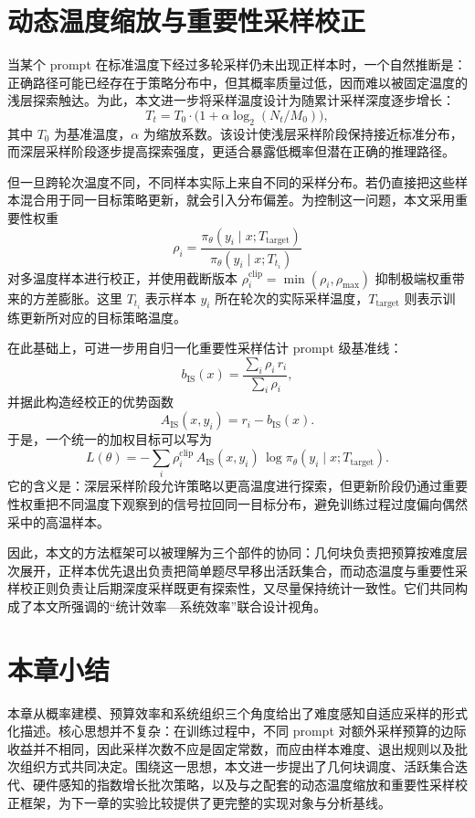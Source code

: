 \section{动态温度缩放与重要性采样校正}

当某个 prompt 在标准温度下经过多轮采样仍未出现正样本时，一个自然推断是：正确路径可能已经存在于策略分布中，但其概率质量过低，因而难以被固定温度的浅层探索触达。为此，本文进一步将采样温度设计为随累计采样深度逐步增长：
\begin{equation}
    T_t = T_0\cdot\bigl(1+\alpha\log_2(N_t/M_0)\bigr),
\end{equation}
其中 $T_0$ 为基准温度，$\alpha$ 为缩放系数。该设计使浅层采样阶段保持接近标准分布，而深层采样阶段逐步提高探索强度，更适合暴露低概率但潜在正确的推理路径。

但一旦跨轮次温度不同，不同样本实际上来自不同的采样分布。若仍直接把这些样本混合用于同一目标策略更新，就会引入分布偏差。为控制这一问题，本文采用重要性权重
\begin{equation}
    \rho_i=\frac{\pi_{\theta}(y_i\mid x;T_{\mathrm{target}})}{\pi_{\theta}(y_i\mid x;T_{t_i})}
\end{equation}
对多温度样本进行校正，并使用截断版本 $\rho_i^{\mathrm{clip}}=\min(\rho_i,\rho_{\max})$ 抑制极端权重带来的方差膨胀。这里 $T_{t_i}$ 表示样本 $y_i$ 所在轮次的实际采样温度，$T_{\mathrm{target}}$ 则表示训练更新所对应的目标策略温度。

在此基础上，可进一步用自归一化重要性采样估计 prompt 级基准线：
\begin{equation}
    b_{\mathrm{IS}}(x)=\frac{\sum_i \rho_i\, r_i}{\sum_i \rho_i},
\end{equation}
并据此构造经校正的优势函数
\begin{equation}
    A_{\mathrm{IS}}(x,y_i)=r_i-b_{\mathrm{IS}}(x).
\end{equation}
于是，一个统一的加权目标可以写为
\begin{equation}
    L(\theta)=-\sum_i \rho_i^{\mathrm{clip}}\,A_{\mathrm{IS}}(x,y_i)\,\log\pi_{\theta}(y_i\mid x;T_{\mathrm{target}}).
\end{equation}
它的含义是：深层采样阶段允许策略以更高温度进行探索，但更新阶段仍通过重要性权重把不同温度下观察到的信号拉回同一目标分布，避免训练过程过度偏向偶然采中的高温样本。

因此，本文的方法框架可以被理解为三个部件的协同：几何块负责把预算按难度层次展开，正样本优先退出负责把简单题尽早移出活跃集合，而动态温度与重要性采样校正则负责让后期深度采样既更有探索性，又尽量保持统计一致性。它们共同构成了本文所强调的“统计效率—系统效率”联合设计视角。

\section{本章小结}

本章从概率建模、预算效率和系统组织三个角度给出了难度感知自适应采样的形式化描述。核心思想并不复杂：在训练过程中，不同 prompt 对额外采样预算的边际收益并不相同，因此采样次数不应是固定常数，而应由样本难度、退出规则以及批次组织方式共同决定。围绕这一思想，本文进一步提出了几何块调度、活跃集合迭代、硬件感知的指数增长批次策略，以及与之配套的动态温度缩放和重要性采样校正框架，为下一章的实验比较提供了更完整的实现对象与分析基线。
